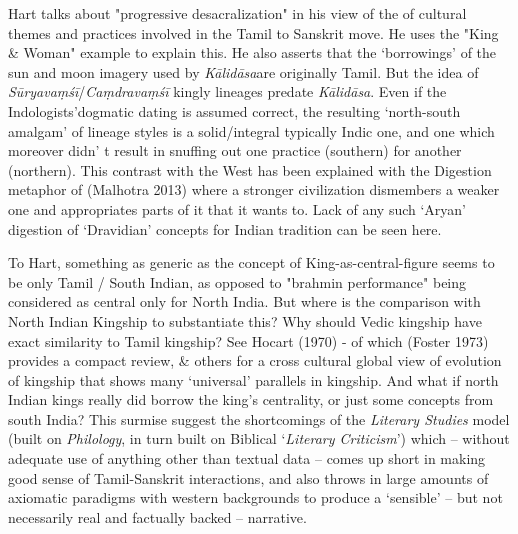 Hart talks about "progressive desacralization" in his view of the of cultural themes and practices involved in the Tamil to Sanskrit move. He uses the "King \& Woman" example to explain this. He also asserts that the ‘borrowings’ of the sun and moon imagery used by \textit{Kālidāsa}are originally Tamil. But the idea of \textit{Sūryavaṃśī}/\textit{Caṃdravaṃśī} kingly lineages predate \textit{Kālidāsa}. Even if the Indologists’dogmatic dating is assumed correct, the resulting ‘north-south amalgam’ of lineage styles is a solid/integral typically Indic one, and one which moreover didn’ t result in snuffing out one practice (southern) for another (northern). This contrast with the West has been explained with the Digestion metaphor of (Malhotra 2013) where a stronger civilization dismembers a weaker one and appropriates parts of it that it wants to. Lack of any such ‘Aryan’ digestion of ‘Dravidian’ concepts for Indian tradition can be seen here.

To Hart, something as generic as the concept of King-as-central-figure seems to be only Tamil / South Indian, as opposed to "brahmin performance" being considered as central only for North India. But where is the comparison with North Indian Kingship to substantiate this? Why should Vedic kingship have exact similarity to Tamil kingship? See Hocart (1970) - of which (Foster 1973) provides a compact review, \& others for a cross cultural global view of evolution of kingship that shows many ‘universal’ parallels in kingship. And what if north Indian kings really did borrow the king’s centrality, or just some concepts from south India? This surmise suggest the shortcomings of the \textit{Literary Studies} model (built on \textit{Philology}, in turn built on Biblical ‘\textit{Literary Criticism}’) which – without adequate use of anything other than textual data – comes up short in making good sense of Tamil-Sanskrit interactions, and also throws in large amounts of axiomatic paradigms with western backgrounds to produce a ‘sensible’ – but not necessarily real and factually backed – narrative.


